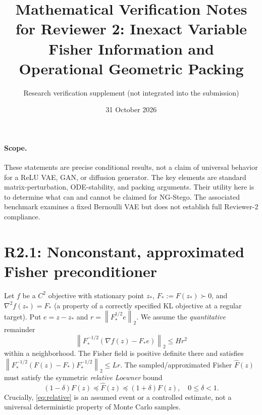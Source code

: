 \documentclass[10pt,a4paper]{article}
\title{Mathematical Verification Notes for Reviewer 2: Inexact Variable Fisher Information and Operational Geometric Packing}
\author{Research verification supplement (not integrated into the submission)}
\date{31 October 2026}
\newcommand{\norm}[1]{\left\lVert#1\right\rVert}
\begin{document}
\maketitle
\paragraph{Scope.} These statements are precise conditional results, not a claim of universal behavior for a ReLU VAE, GAN, or diffusion generator. The key elements are standard matrix-perturbation, ODE-stability, and packing arguments. Their utility here is to determine what can and cannot be claimed for NG-Stego. The associated benchmark examines a fixed Bernoulli VAE but does not establish full Reviewer-2 compliance.

\section{R2.1: Nonconstant, approximated Fisher preconditioner}
Let $f$ be a $C^2$ objective with stationary point $z_*$, $F_*:=F(z_*)\succ0$, and $\nabla^2f(z_*)=F_*$ (a property of a correctly specified KL objective at a regular target). Put $e=z-z_*$ and $r=\norm{F_*^{1/2}e}_2$. We assume the \emph{quantitative} remainder
\begin{equation}\label{eq:remainder}
\norm{F_*^{-1/2}(\nabla f(z)-F_*e)}_2\le H r^2
\end{equation}
within a neighborhood. The Fisher field is positive definite there and satisfies
$\norm{F_*^{-1/2}(F(z)-F_*)F_*^{-1/2}}_2\le Lr$.
The sampled/approximated Fisher $\widehat F(z)$ must satisfy the symmetric \emph{relative Loewner} bound
\begin{equation}\label{eq:relative}
(1-\delta)F(z)\preceq\widehat F(z)\preceq(1+\delta)F(z),\quad 0\le\delta<1.
\end{equation}
Crucially, \eqref{eq:relative} is an assumed event or a controlled estimate, not a universal deterministic property of Monte Carlo samples.
\end{document}
